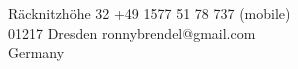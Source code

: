 {\Huge \name}
\vspace{0.5cm}

R\"acknitzh\"ohe 32 \hfill +49 1577 51 78 737 (mobile)\\
01217 Dresden \hfill ronnybrendel@gmail.com\\
Germany \hfill

\vspace{0.6cm}
